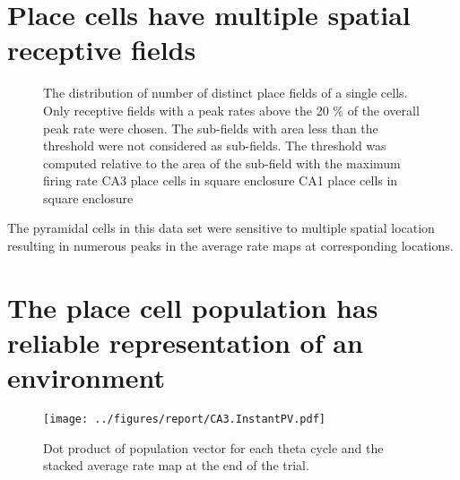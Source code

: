 \section[Multiple Place fields]{Place cells have multiple spatial receptive fields}
\begin{figure}[htb!]
\centering
{}
\caption[Multiple receptive fields of Place Cells]{The distribution of number of distinct place fields of a single cells. Only receptive fields with a peak rates above the 20 \% of the overall peak rate were chosen. The sub-fields with area less than the threshold were not considered as sub-fields. The threshold was computed relative to the area of the sub-field with the maximum firing rate  CA3 place cells in square enclosure  CA1 place cells in square enclosure}
\label{fig:nsubfields}
\end{figure}

The pyramidal cells in this data set were sensitive to multiple spatial location resulting in numerous peaks in the average rate maps at corresponding locations. \\

\section[Population activity within a fixed environment]{The place cell population has reliable representation of an environment}

\begin{figure}[htb!]
\centering
\texttt{[image: ../figures/report/CA3.InstantPV.pdf]}
\caption[Population Vector, fine time scale]{Dot product of population vector for each theta cycle and the stacked average rate map at the end of the trial.}
\label{fig:tpv}
\end{figure}

